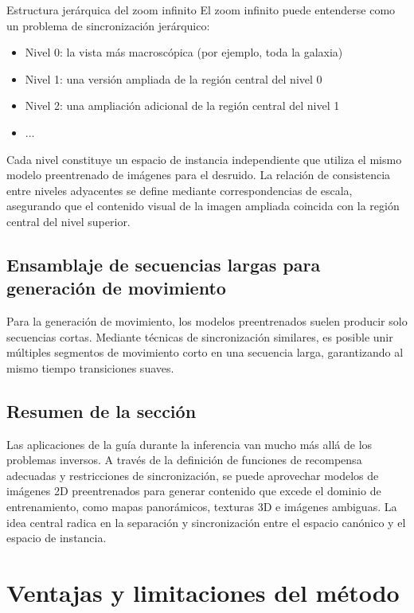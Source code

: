 \documentclass[a4paper]{article}
\begin{document}
\begin{knowledgebox}{Estructura jerárquica del zoom infinito}
El zoom infinito puede entenderse como un problema de sincronización jerárquico:
\begin{itemize}
    \item Nivel 0: la vista más macroscópica (por ejemplo, toda la galaxia)
    \item Nivel 1: una versión ampliada de la región central del nivel 0
    \item Nivel 2: una ampliación adicional de la región central del nivel 1
    \item $\ldots$
\end{itemize}
Cada nivel constituye un espacio de instancia independiente que utiliza el mismo modelo preentrenado de imágenes para el desruido. La relación de consistencia entre niveles adyacentes se define mediante correspondencias de escala, asegurando que el contenido visual de la imagen ampliada coincida con la región central del nivel superior.
\end{knowledgebox}

\subsection{Ensamblaje de secuencias largas para generación de movimiento}

Para la generación de movimiento, los modelos preentrenados suelen producir solo secuencias cortas. Mediante técnicas de sincronización similares, es posible unir múltiples segmentos de movimiento corto en una secuencia larga, garantizando al mismo tiempo transiciones suaves.

\subsection{Resumen de la sección}

Las aplicaciones de la guía durante la inferencia van mucho más allá de los problemas inversos. A través de la definición de funciones de recompensa adecuadas y restricciones de sincronización, se puede aprovechar modelos de imágenes 2D preentrenados para generar contenido que excede el dominio de entrenamiento, como mapas panorámicos, texturas 3D e imágenes ambiguas. La idea central radica en la separación y sincronización entre el espacio canónico y el espacio de instancia.
\section{Ventajas y limitaciones del método}
\end{document}
